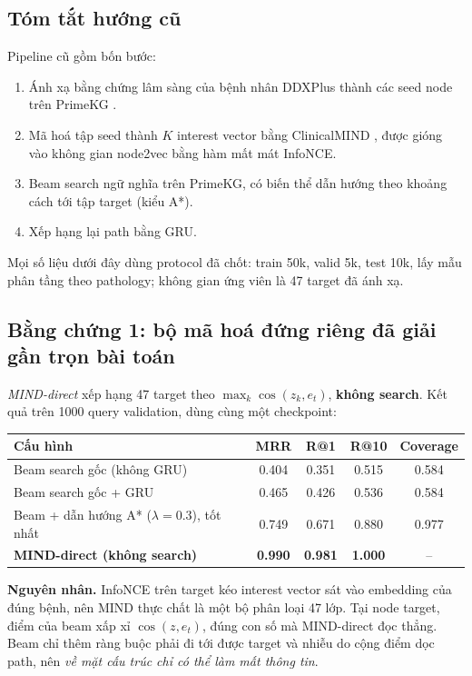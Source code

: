 \documentclass[11pt,a4paper]{article}
\theoremstyle{remark}
\begin{document}
\subsection{Tóm tắt hướng cũ}
Pipeline cũ gồm bốn bước:
\begin{enumerate}[nosep]
  \item Ánh xạ bằng chứng lâm sàng của bệnh nhân DDXPlus \cite{ddxplus} thành các seed node trên PrimeKG \cite{primekg}.
  \item Mã hoá tập seed thành $K$ interest vector bằng ClinicalMIND \cite{mind}, được gióng vào không gian node2vec bằng hàm mất mát InfoNCE.
  \item Beam search ngữ nghĩa trên PrimeKG, có biến thể dẫn hướng theo khoảng cách tới tập target (kiểu A*).
  \item Xếp hạng lại path bằng GRU.
\end{enumerate}
Mọi số liệu dưới đây dùng protocol đã chốt: train 50k, valid 5k, test 10k, lấy mẫu phân tầng theo pathology; không gian ứng viên là 47 target đã ánh xạ.

\subsection{Bằng chứng 1: bộ mã hoá đứng riêng đã giải gần trọn bài toán}
\emph{MIND-direct} xếp hạng 47 target theo $\max_k \cos(z_k, e_t)$, \textbf{không search}. Kết quả trên 1000 query validation, dùng cùng một checkpoint:

\begin{center}
\begin{tabular}{lcccc}
\toprule
Cấu hình & MRR & R@1 & R@10 & Coverage \\
\midrule
Beam search gốc (không GRU) & 0.404 & 0.351 & 0.515 & 0.584 \\
Beam search gốc + GRU & 0.465 & 0.426 & 0.536 & 0.584 \\
Beam + dẫn hướng A* ($\lambda=0.3$), tốt nhất & 0.749 & 0.671 & 0.880 & 0.977 \\
\textbf{MIND-direct (không search)} & \textbf{0.990} & \textbf{0.981} & \textbf{1.000} & -- \\
\bottomrule
\end{tabular}
\end{center}

\noindent\textbf{Nguyên nhân.} InfoNCE trên target kéo interest vector sát vào embedding của đúng bệnh, nên MIND thực chất là một bộ phân loại 47 lớp. Tại node target, điểm của beam xấp xỉ $\cos(z, e_t)$, đúng con số mà MIND-direct đọc thẳng. Beam chỉ thêm ràng buộc phải đi tới được target và nhiễu do cộng điểm dọc path, nên \emph{về mặt cấu trúc chỉ có thể làm mất thông tin}.
\end{document}
